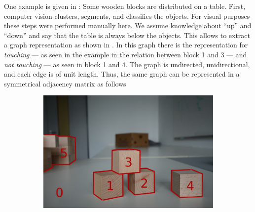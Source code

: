 One example is given in : Some wooden blocks are distributed on a table.
First, computer vision clusters, segments, and classifies the objects.
For visual purposes these steps were performed manually here.
We assume knowledge about ``up'' and ``down'' and say that the table is always below the objects.
This allows to extract a graph representation as shown in .
In this graph there is the representation for \emph{touching} --- as seen in the example in the relation between block 1 and 3 --- and \emph{not touching} --- as seen in block 1 and 4.
The graph is undirected, unidirectional, and each edge is of unit length. 
Thus, the same graph can be represented in a symmetrical adjacency matrix as follows


\begin{figure}
  \centering
  \begin{subfigure}[t]{0.475\textwidth}
    \includegraphics[width=\textwidth]{./figures/sec/secexample_blocksmarkednumbered.jpg}
    \label{fig:sec_secexample_blocksmarkednumbered}
  \end{subfigure}
  \hfill
  \begin{subfigure}[t]{0.475\textwidth}
\end{subfigure}
\end{figure}
